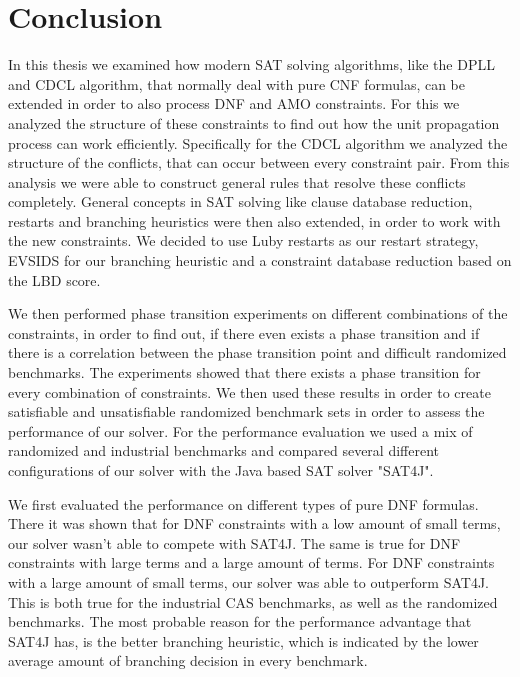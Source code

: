 
\chapter{Conclusion}
\label{ch:Conclusion}

In this thesis we examined how modern SAT solving algorithms, like the DPLL and CDCL algorithm, that normally deal with pure CNF formulas, can be extended in order to also process DNF and AMO constraints. For this we analyzed the structure of these constraints to find out how the unit propagation process can work efficiently. Specifically for the CDCL algorithm we analyzed the structure of the conflicts, that can occur between every constraint pair. From this analysis we were able to construct general rules that resolve these conflicts completely. General concepts in SAT solving like clause database reduction, restarts and branching heuristics were then also extended, in order to work with the new constraints. We decided to use Luby restarts as our restart strategy, EVSIDS for our branching heuristic and a constraint database reduction based on the LBD score. 

We then performed phase transition experiments on different combinations of the constraints, in order to find out, if there even exists a phase transition and if there is a correlation between the phase transition point and difficult randomized benchmarks. The experiments showed that there exists a phase transition for every combination of constraints. We then used these results in order to create satisfiable and unsatisfiable randomized benchmark sets in order to assess the performance of our solver. For the performance evaluation  we used a mix of randomized and industrial benchmarks and compared several different configurations of our solver with the Java based SAT solver "SAT4J".

We first evaluated the performance on different types of pure DNF formulas. There it was shown that for DNF constraints with a low amount of small terms, our solver wasn't able to compete with SAT4J. The same is true for DNF constraints with large terms and a large amount of terms. For DNF constraints with a large amount of small terms, our solver was able to outperform SAT4J. This is both true for the industrial CAS benchmarks, as well as the randomized benchmarks. The most probable reason for the performance advantage that SAT4J has, is the better branching heuristic, which is indicated by the lower average amount of branching decision in every benchmark.


